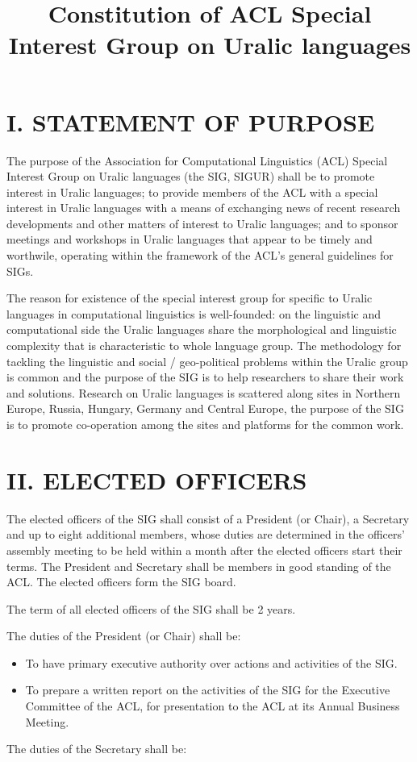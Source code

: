 \documentclass[11pt,a4paper]{article}
\title{Constitution of ACL Special Interest Group on Uralic languages}
\date{}
\begin{document}
\maketitle

\section*{I. STATEMENT OF PURPOSE}

The purpose of the Association for Computational Linguistics (ACL) Special Interest Group on Uralic languages (the SIG, SIGUR) shall be to promote interest in Uralic languages; to provide members of the ACL with a special interest in Uralic languages with a means of exchanging news of recent research developments and other matters of interest to Uralic languages; and to sponsor meetings and workshops in Uralic languages that appear to be timely and worthwile, operating within the framework of the ACL's general guidelines for SIGs.

The reason for existence of the special interest group for specific to Uralic languages in computational linguistics is well-founded: on the linguistic and computational side the Uralic languages share the morphological and linguistic complexity that is characteristic to whole language group. The methodology for tackling the linguistic and social / geo-political problems within the Uralic group is common and the purpose of the SIG is to help researchers to share their work and solutions. Research on Uralic languages is scattered along sites in Northern Europe, Russia, Hungary, Germany and Central Europe, the purpose of the SIG is to promote co-operation among the sites and platforms for the common work.

\section*{II. ELECTED OFFICERS}

The elected officers of the SIG shall consist of a President (or Chair), a Secretary and up to eight additional members, whose duties are determined in the officers' assembly meeting to be held within a month after the elected officers start their terms. The President and Secretary shall be members in good standing of the ACL. The elected officers form the SIG board.

The term of all elected officers of the SIG shall be 2 years.

The duties of the President (or Chair) shall be:
\begin{itemize}
\item    To have primary executive authority over actions and activities of the SIG.
\item    To prepare a written report on the activities of the SIG for the Executive Committee of the ACL, for presentation to the ACL at its Annual Business Meeting.
\end{itemize}
The duties of the Secretary shall be:
\end{document}
